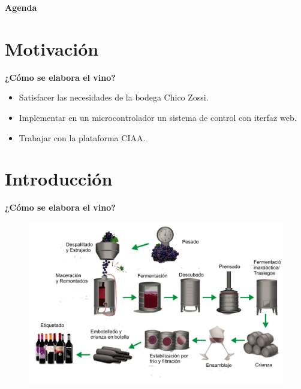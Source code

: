 \documentclass[11pt]{beamer}
\begin{document}
\begin{frame}{\textbf{\LARGE{Agenda}}}
  \fontsize{18pt}{18}\selectfont
  \tableofcontents
\end{frame}

\section{Motivación}
\begin{frame}{\textbf{\LARGE{¿Cómo se elabora el vino?}}}
  \begin{itemize}
    \item Satisfacer las necesidades de la bodega Chico Zossi.
      \vspace{5px}
    \item Implementar en un microcontrolador un sistema de control con iterfaz web.
      \vspace{5px}
    \item Trabajar con la plataforma CIAA.
  \end{itemize}
\end{frame}

\section{Introducción}

\begin{frame}{\textbf{\LARGE{¿Cómo se elabora el vino?}}}
  \fontsize{18pt}{18}\selectfont
  \hspace{-40px}
  \vspace{-30px}
  \begin{figure}[H]
    \includegraphics[width=1\textwidth]{./imagenes/elaboracion-del-vino-tinto.png}
  \end{figure}	  	  	
\end{frame}
\end{document}
